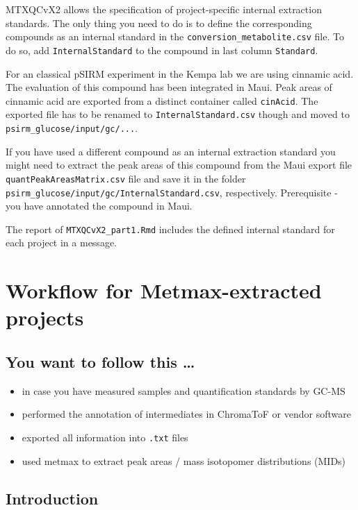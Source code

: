 \documentclass[]{book}
\providecommand{\tightlist}{%
  \setlength{\itemsep}{0pt}\setlength{\parskip}{0pt}}
\begin{document}
MTXQCvX2 allows the specification of project-specific internal
extraction standards. The only thing you need to do is to define the
corresponding compounds as an internal standard in the
\texttt{conversion\_metabolite.csv} file. To do so, add
\texttt{InternalStandard} to the compound in last column
\texttt{Standard}.

For an classical pSIRM experiment in the Kempa lab we are using cinnamic
acid. The evaluation of this compound has been integrated in Maui. Peak
areas of cinnamic acid are exported from a distinct container called
\texttt{cinAcid}. The exported file has to be renamed to
\texttt{InternalStandard.csv} though and moved to
\texttt{psirm\_glucose/input/gc/...}.

If you have used a different compound as an internal extraction standard
you might need to extract the peak areas of this compound from the Maui
export file \texttt{quantPeakAreasMatrix.csv} file and save it in the
folder \texttt{psirm\_glucose/input/gc/InternalStandard.csv},
respectively. Prerequisite - you have annotated the compound in Maui.

The report of \texttt{MTXQCvX2\_part1.Rmd} includes the defined internal
standard for each project in a message.

\hypertarget{wf:metmax}{\chapter{Workflow for Metmax-extracted
projects}\label{wf:metmax}}

\section{You want to follow this
\ldots{}}\label{you-want-to-follow-this}

\begin{itemize}
\tightlist
\item
  in case you have measured samples and quantification standards by
  GC-MS
\item
  performed the annotation of intermediates in ChromaToF or vendor
  software
\item
  exported all information into \texttt{.txt} files
\item
  used metmax to extract peak areas / mass isotopomer distributions
  (MIDs)
\end{itemize}

\section{Introduction}\label{introduction}
\end{document}
